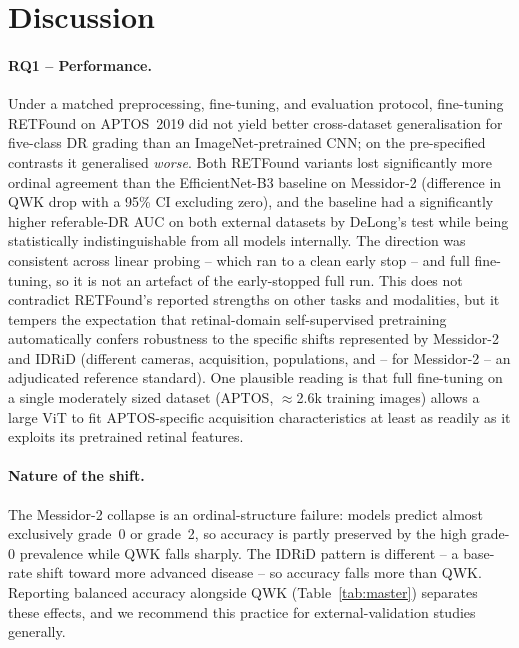 \documentclass[11pt,a4paper]{article}
\begin{document}
\section{Discussion}
\label{sec:discussion}

\paragraph{RQ1 -- Performance.} Under a matched preprocessing, fine-tuning, and
evaluation protocol, fine-tuning RETFound on APTOS~2019 did not yield better
cross-dataset generalisation for five-class DR grading than an
ImageNet-pretrained CNN; on the pre-specified contrasts it generalised
\emph{worse}. Both RETFound variants lost significantly more ordinal agreement
than the EfficientNet-B3 baseline on Messidor-2 (difference in QWK drop with a
95\% CI excluding zero), and the baseline had a significantly higher referable-DR
AUC on both external datasets by DeLong's test while being statistically
indistinguishable from all models internally. The direction was consistent
across linear probing -- which ran to a clean early stop -- and full fine-tuning,
so it is not an artefact of the early-stopped full run. This does not contradict
RETFound's reported strengths on other tasks and modalities, but it tempers the
expectation that retinal-domain self-supervised pretraining automatically confers
robustness to the specific shifts represented by Messidor-2 and IDRiD (different
cameras, acquisition, populations, and -- for Messidor-2 -- an adjudicated
reference standard). One plausible reading is that full fine-tuning on a
single moderately sized dataset (APTOS, $\approx$2.6k training images) allows a
large ViT to fit APTOS-specific acquisition characteristics at least as readily
as it exploits its pretrained retinal features.

\paragraph{Nature of the shift.} The Messidor-2 collapse is an ordinal-structure
failure: models predict almost exclusively grade~0 or grade~2, so accuracy is
partly preserved by the high grade-0 prevalence while QWK falls sharply. The
IDRiD pattern is different -- a base-rate shift toward more advanced disease --
so accuracy falls more than QWK. Reporting balanced accuracy alongside QWK
(Table~\ref{tab:master}) separates these effects, and we recommend this practice
for external-validation studies generally.
\end{document}
